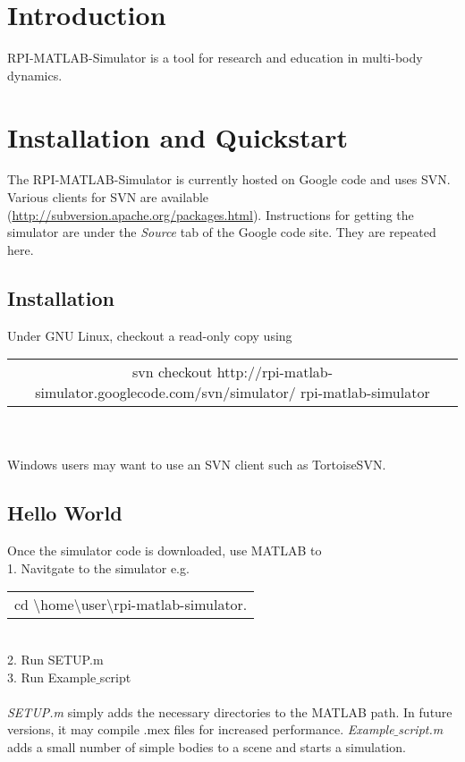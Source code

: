 \documentclass{article}
\newcommand{\tab}{\hspace*{2em}}
\begin{document}
\maketitle

\newpage
\tableofcontents

\newpage
\section{Introduction}
\label{sec:introduction}
RPI-MATLAB-Simulator is a tool for research and education in multi-body dynamics.  


\section{Installation and Quickstart}
The RPI-MATLAB-Simulator is currently hosted on Google code and uses SVN.  Various clients for SVN are available (\url{http://subversion.apache.org/packages.html}).
Instructions for getting the simulator are under the \emph{Source} tab of the Google code site.  They are repeated here.
\subsection{Installation}
Under GNU Linux, checkout a read-only copy using \\ 
	\begin{tabular}{c} 
\rowcolor[gray]{.9}	
	svn checkout http://rpi-matlab-simulator.googlecode.com/svn/simulator/ rpi-matlab-simulator
    \end{tabular} \\ \\
Windows users may want to use an SVN client such as TortoiseSVN.  
 
\subsection{Hello World}
Once the simulator code is downloaded, use MATLAB to \\ 
\tab 1. Navitgate to the simulator e.g. 
\begin{tabular}{c} 
\rowcolor[gray]{.9}	
	cd \textbackslash home\textbackslash user\textbackslash rpi-matlab-simulator. 
    \end{tabular} \\
\tab 2. Run SETUP.m  \\
\tab 3. Run Example$\_$script  \\ \\
\emph{SETUP.m} simply adds the necessary directories to the MATLAB path.  In future versions, it may compile .mex files for increased performance.  
\emph{Example$\_$script.m} adds a small number of simple bodies to a scene and starts a simulation.  
\end{document}
